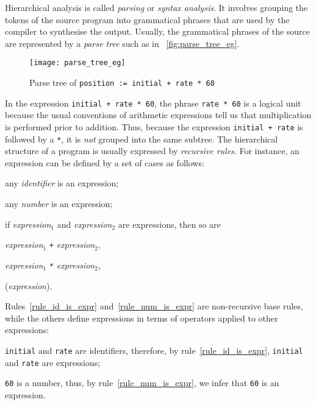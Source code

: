 Hierarchical analysis is called \emph{parsing} or \emph{syntax
analysis}. It involves grouping the tokens of the source program into
grammatical phrases that are used by the compiler to synthesise the
output. Usually, the grammatical phrases of the source are represented
by a \emph{parse tree} such as in \fig~\vref{fig:parse_tree_eg}.
\begin{figure}
\centering
\texttt{[image: parse\_tree\_eg]}
\caption{Parse tree of \texttt{position := initial + rate * 60}}
\label{fig:parse_tree_eg}
\end{figure}
In the expression \texttt{initial + rate * 60}, the phrase
\texttt{rate * 60} is a logical unit because the usual conventions of
arithmetic expressions tell us that multiplication is performed prior
to addition. Thus, because the expression \texttt{initial + rate} is
followed by a \verb+*+, it is \emph{not} grouped into the same
subtree. The hierarchical structure of a program is usually expressed
by \emph{recursive rules}. For instance, an expression can be defined
by a set of cases as follows:
\begin{enumerate*}

  \item any \emph{identifier} is an expression;\label{rule_id_is_expr}

  \item any \emph{number} is an expression;\label{rule_num_is_expr}

  \item if \emph{expression}\(_1\) and \emph{expression}\(_2\) are
  expressions, then so are
   \begin{enumerate*}

     \item \emph{expression}\(_1\) \verb|+|
       \emph{expression}\(_2\), \label{rule_add_is_expr}

     \item \emph{expression}\(_1\) \verb|*|
       \emph{expression}\(_2\), \label{rule_mult_is_expr}

     \item (\emph{expression}).

   \end{enumerate*}

\end{enumerate*}
Rules~\ref{rule_id_is_expr} and~\ref{rule_num_is_expr} are
non-recursive base rules, while the others define expressions in terms
of operators applied to other expressions:
\begin{itemize*}

  \item \texttt{initial} and \texttt{rate} are identifiers, therefore,
  by rule~\ref{rule_id_is_expr}, \texttt{initial} and \texttt{rate}
  are expressions;

  \item \texttt{60} is a number, thus, by rule~\ref{rule_num_is_expr},
    we infer that \texttt{60} is an expression.

\end{itemize*}
